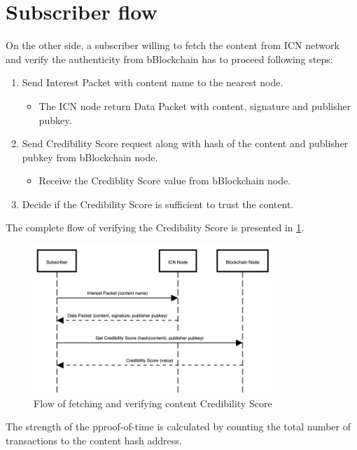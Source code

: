 \section{Subscriber flow}
On the other side, a subscriber willing to fetch the content from ICN network and verify the authenticity from bBlockchain has to proceed following steps:
\begin{enumerate}
    \item Send Interest Packet with content name to the nearest node.
    \begin{itemize}
        \item The ICN node return Data Packet with content, signature and publisher pubkey.
    \end{itemize}
    \item Send Credibility Score request along with hash of the content and publisher pubkey from bBlockchain node.
    \begin{itemize}
        \item Receive the Crediblity Score value from bBlockchain node.
    \end{itemize}
    \item Decide if the Credibility Score is sufficient to trust the content.
\end{enumerate}
The complete flow of verifying the Credibility Score is presented in \ref{fig:verifying-flow}.
\begin{figure}[h!]
\includegraphics[width=9cm]{img/verifying-flow.png}
\centering
\caption{Flow of fetching and verifying content Credibility Score}
\label{fig:verifying-flow}
\end{figure} 

The strength of the pproof-of-time is calculated by counting the total number of transactions to the content hash address.

